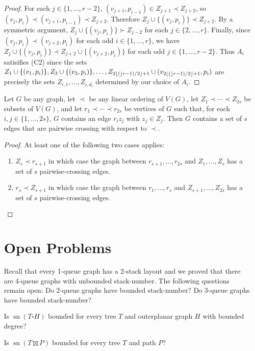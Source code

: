 \documentclass[kpfonts]{patmorin}
\DeclareMathOperator{\sn}{sn}
\begin{document}
\begin{proof}
    For each $j\in\{1,\ldots,r-2\}$, $(v_{j+1},p_{i-1})\in Z_{j+1}\prec Z_{j+2}$, so  $(v_j,p_i)\prec (v_{j+1},p_{i-1}) \prec Z_{j+2}$.  Therefore $Z_j\cup\{(v_j,p_i)\} \prec Z_{j+2}$.  By a symmetric argument, $Z_j\cup\{(v_j,p_i)\} \succ Z_{j-2}$ for each  $j\in\{2,\ldots,r\}$.  Finally, since $(v_{j},p_i)\prec (v_{j+2},p_i)$ for each odd $i\in\{1,\ldots,r\}$, we have $Z_{j}\cup\{(v_j,p_i)\} \prec Z_{j+2}\cup\{(v_{j+2},p_i)\}$ for each odd $j\in\{1,\ldots,r-2\}$.  Thus $A_i$ satisifies (C2) since the sets $Z_1\cup\{(v_1,p_i)\},Z_3\cup\{(v_3,p_i)\},\ldots,Z_{2{\lfloor ( \rfloor}r-1)/2\rfloor+1} \cup (v_{2{\lfloor ( \rfloor}r-1)/2\rfloor+1},p_i)$ are precisely the sets $Z_{i,1},\ldots,Z_{i,d_i}$ determined by our choice of $A_i$.
\end{proof}

\begin{lem}
    Let $G$ be any graph, let $\prec$ be any linear ordering of $V(G)$,  let $Z_{1}\prec\cdots\prec Z_{2s}$ be subsets of $V(G)$, and let $r_1\prec\cdots\prec r_{2s}$ be vertices of $G$ such that, for each $i,j\in\{1,\ldots,2s\}$, $G$ contains an edge $r_iz_j$ with $z_j\in Z_j$. Then $G$ contains a set of $s$ edges that are pairwise crossing with respect to $\prec$.
\end{lem}

\begin{proof}
    At least one of the following two cases applies:
    \begin{enumerate}
        \item $Z_s\prec r_{s+1}$ in which case the graph between $r_{s+1},\ldots,r_{2s}$ and $Z_1,\ldots,Z_s$ has a set of $s$ pairwise-crossing edges.
        \item $r_{s}\prec Z_{s+1}$ in which case the graph between $r_1,\ldots,r_s$ and $Z_{s+1},\ldots,Z_{2s}$ has a set of $s$ pairwise-crossing edges. \qedhere
    \end{enumerate}
\end{proof}

\section{Open Problems}

Recall that every 1-queue graph has a 2-stack layout \citep{HLR92} and we proved that there are 4-queue graphs with unbounded stack-number. The following questions remain open: Do 2-queue graphs have bounded stack-number? Do 3-queue graphs have bounded stack-number?

Is $\sn(T \square H)$ bounded for every tree $T$ and outerplanar graph $H$ with bounded degree?

Is $\sn(T \boxtimes P)$ bounded for every tree $T$ and path $P$?



%
%
\end{document}
